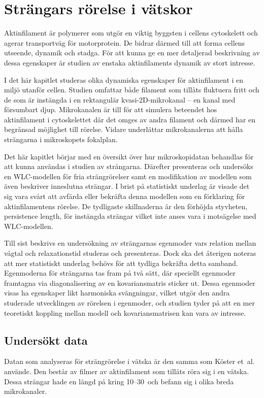 \chapter{Strängars rörelse i vätskor}

Aktinfilament är polymerer som utgör en viktig byggsten i cellens cytoskelett och agerar transportväg för motorprotein. De bidrar därmed till att forma cellens utseende, dynamik och stadga. För att kunna ge en mer detaljerad beskrivning av dessa egenskaper är studien av enstaka aktinfilaments dynamik av stort intresse. 

I det här kapitlet studeras olika dynamiska egenskaper för aktinfilament i en miljö utanför cellen. Studien omfattar både filament som tillåts fluktuera fritt och de som är instängda i en rektangulär kvasi-2D-mikrokanal -- en kanal med försumbart djup. Mikrokanalen är till för att simulera beteendet hos aktinfilament i cytoskelettet där det omges av andra filament och därmed har en begränsad möjlighet till rörelse. Vidare underlättar mikrokanalerna att hålla strängarna i mikroskopets fokalplan.

Det här kapitlet börjar med en översikt över hur mikroskopidatan behandlas för att kunna användas i studien av strängarna. Därefter presenteras och undersöks en WLC-modellen för fria strängrörelser samt en modifikation av modellen som även beskriver inneslutna strängar. I brist på statistiskt underlag är visade det sig vara svårt att avfärda eller bekräfta denna modellen som en förklaring för aktinfilamentens rörelse. De tydligaste skillnaderna är den förhöjda styvheten, persistence length, för instängda strängar vilket inte anses vara i motsägelse med WLC-modellen.

Till sist beskrivs en undersökning av strängarnas egenmoder vars relation mellan vågtal och relaxationstid studeras och presenteras. Dock ska det återigen noteras att mer statistiskt underlag behövs för att tydliga bekräfta detta samband. Egenmoderna för strängarna tas fram på två sätt, där speciellt egenmoder framtagna via diagonalisering av en kovariansmatris sticker ut. Dessa egenmoder visas ha egenskaper likt harmoniska svängningar, vilket utgör den andra studerade utvecklingen av rörelsen i egenmoder, och studien tyder på att en mer teoretiskt koppling mellan modell och kovariansmatrisen kan vara av intresse. 

\section{Undersökt data}
Datan som analyseras för strängrörelse i vätska är den samma som Köster et~al.~\cite{Koster_etal2005,Koster_etal2007,Koster_etal2008} använde. Den består av filmer av aktinfilament som tillåts röra sig i en vätska. Dessa strängar hade en längd på kring 10--30\, och befann sig i olika breda mikrokanaler. 

